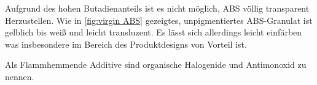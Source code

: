         Aufgrund des hohen Butadienanteils ist es nicht möglich, ABS völlig transparent Herzustellen. Wie in \cref{fig:virgin ABS}
        gezeigtes, unpigmentiertes ABS-Granulat ist gelblich bis weiß und leicht transluzent. Es lässt sich allerdings
        leicht einfärben was insbesondere im Bereich des Produktdesigns von Vorteil ist.\par
        Als Flammhemmende Additive sind organische Halogenide und Antimonoxid zu nennen.